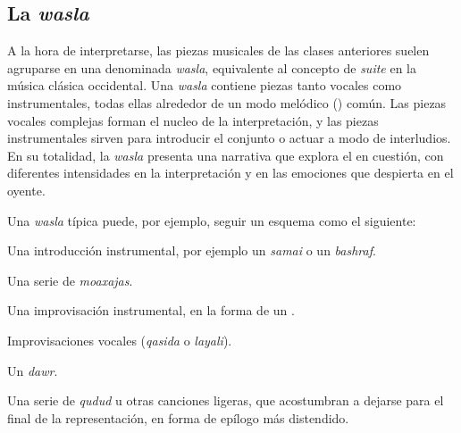   \subsection{La \emph{wasla}}

      A la hora de interpretarse, las piezas musicales de las clases anteriores suelen agruparse en una denominada \emph{wasla}, equivalente al concepto de \emph{suite} en la música clásica occidental. Una \emph{wasla} contiene piezas tanto vocales como instrumentales, todas ellas alrededor de un modo melódico (\maqamb) común. Las piezas vocales complejas forman el nucleo de la interpretación, y las piezas instrumentales sirven para introducir el conjunto o actuar a modo de interludios. En su totalidad, la \emph{wasla} presenta una narrativa que explora el \maqam en cuestión, con diferentes intensidades en la interpretación y en las emociones que despierta en el oyente.

      Una \emph{wasla} típica puede, por ejemplo, seguir un esquema como el siguiente:

      \begin{compactitem}
        \item Una introducción instrumental, por ejemplo un \emph{samai} o un \emph{bashraf}.
        \item Una serie de \emph{moaxajas}.
        \item Una improvisación instrumental, en la forma de un \taqsimb.
        \item Improvisaciones vocales (\emph{qasida} o \emph{layali}).
        \item Un \emph{dawr}.
        \item Una serie de \emph{qudud} u otras canciones ligeras, que acostumbran a dejarse para el final de la representación, en forma de epílogo más distendido.
      \end{compactitem}





